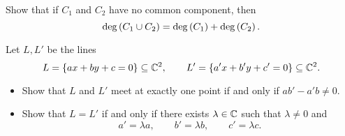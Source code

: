 \begin{exercise}
Show that if $ C_1 $ and $ C_2 $ have no common component, then
$$ \deg\left( C_1 \cup C_2 \right) = \deg\left( C_1 \right) + \deg\left( C_2 \right). $$
\end{exercise}

\begin{exercise}
Let $ L, L' $ be the lines
$$ L = \left\{ ax + by + c = 0 \right\} \subseteq \mathbb{C}^2, \qquad L' = \left\{ a'x + b'y + c' = 0 \right\} \subseteq \mathbb{C}^2. $$
\begin{itemize}
\item Show that $ L $ and $ L' $ meet at exactly one point if and only if $ ab' - a'b \ne 0 $.
\item Show that $ L = L' $ if and only if there exists $ \lambda \in \mathbb{C} $ such that $ \lambda \ne 0 $ and
$$ a' = \lambda a, \qquad b' = \lambda b, \qquad c' = \lambda c. $$
\end{itemize}
\end{exercise}

\pagebreak


